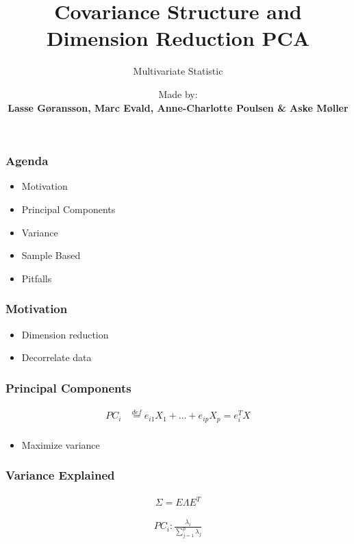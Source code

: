 \documentclass[aspectratio=169,10pt,t]{beamer}
\title{Covariance Structure and Dimension Reduction PCA}
\subtitle{Multivariate Statistic}
\date{ }
\author{
	Made by: \\
	\textbf{Lasse Gøransson, Marc Evald, Anne-Charlotte Poulsen \& Aske Møller}
}
\institute[
  SDU Robotics\\
  The Maersk Mc-Kinney Moller Institute\\
  University of Southern Denmark
] %
{%
  SDU Robotics\\
  The Maersk Mc-Kinney Moller Institute\\
  University of Southern Denmark

}
\begin{document}
{\SDUwavesbg%
\begin{frame} %
  \titlepage
\end{frame}}

\begin{frame}[t]
    \frametitle{Agenda}
    \begin{itemize}
        \item Motivation
        \item Principal Components
        \item Variance
        \item Sample Based
        \item Pitfalls
    \end{itemize}

\end{frame}

\begin{frame}[t]
	\frametitle{Motivation}

    \begin{itemize}
        \item Dimension reduction
        \item Decorrelate data
    \end{itemize}

\end{frame}

\begin{frame}[t]
    \frametitle{Principal Components}
    
    \begin{align*}
			PC_i &\overset{def}{=} e_{i1} X_1 + \hdots + e_{ip} X_p = e_i^T X\\
    \end{align*}

    \pause

    \begin{itemize}
        \item Maximize variance
    \end{itemize}
\end{frame}

\begin{frame}[t]
    \frametitle{Variance Explained}
    
    \begin{align*}
    \Sigma =  E\Lambda E^T
    \end{align*}

    \begin{align*}
    PC_i: \frac{\lambda_i}{ \sum^{p}_{j=1} \lambda_j  }
    \end{align*}
    
    
\end{frame}
\end{document}
